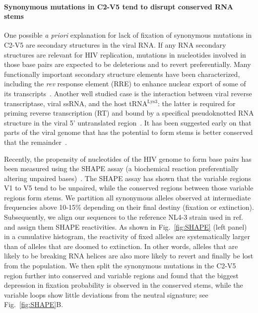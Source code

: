 \documentclass[rmp, twocolumn]{revtex4}
\newcommand{\rev}{\textit{rev}}
\newcommand{\FIG}[1]{Fig.~\ref{fig:#1}}
\begin{document}
\paragraph{Synonymous mutations in C2-V5 tend to disrupt conserved RNA stems}
One possible {\it a priori} explanation for lack of fixation of synonymous
mutations in C2-V5 are  secondary structures in the viral RNA. If any RNA
secondary structures are relevant for HIV replication, mutations in nucleotides
involved in those base pairs are expected  to be deleterious and to revert
preferentially.  Many functionally important secondary structure elements have
been characterized, including  the  \rev{} response element (RRE) to enhance
nuclear export of some of its transcripts~\citep{fernandes_hiv-1_2012}. Another
well studied case is the interaction between viral reverse transcriptase, viral
ssRNA, and the host tRNA$^\text{Lys3}$: the latter is required for priming
reverse transcription (RT) and bound by a specifical pseudoknotted RNA structure
in the viral 5' untranslated region~\citep{barat_interaction_1991,
paillart_vitro_2002}. It has been suggested early on that parts of the viral
genome that has the potential to form stems is better conserved that the
remainder~\citep{forsdyke_reciprocal_1995}.

Recently, the propensity of nucleotides of the HIV genome to form base pairs has
been measured using the SHAPE assay (a biochemical reaction preferentially
altering unpaired bases)~\citep{watts_architecture_2009}. The SHAPE assay has
shown that the variable regions V1 to V5 tend to be unpaired, while the
conserved regions between those variable regions form stems. We partition all
synonymous alleles observed at intermediate frequencies above 10-15\% depending
on their final destiny (fixation or extinction). Subsequently, we align our
sequences to the reference NL4-3 strain used in
ref.~\citep{watts_architecture_2009} and assign them SHAPE reactivities. As
shown in \FIG{SHAPE} (left panel) in a cumulative histogram, the reactivity of
fixed alleles are systematically larger than of alleles that are doomed to
extinction. In other words, alleles that are likely to be breaking RNA helices
are also more likely to revert and finally be lost from the population. We then
split the synonymous mutations in the C2-V5 region further into conserved and
variable regions and found that the biggest depression in fixation probability
is observed in the conserved stems, while the variable loops show little
deviations from the neutral signature; see \FIG{SHAPE}B. 
\end{document}
